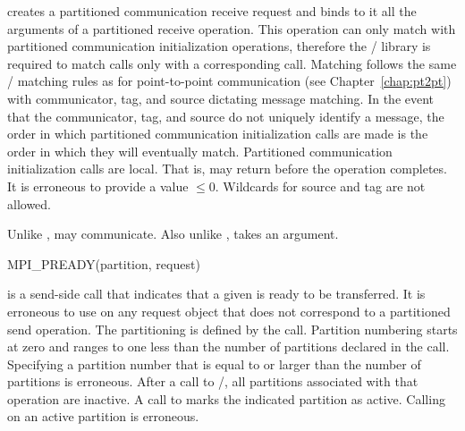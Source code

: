  creates a partitioned communication receive request
and binds to it all the
arguments of a partitioned receive operation.
This operation can only match with partitioned communication initialization operations,
therefore the \MPI/ library is required to match  calls only with a corresponding
 call. 
Matching follows the same \MPI/ matching rules as for point-to-point communication (see Chapter~\ref{chap:pt2pt}) with communicator, tag, and source dictating
message matching. In the event that the communicator, tag, and source do not
uniquely identify a message, the order in which partitioned 
communication initialization calls are made
is the order in which they will eventually match.
Partitioned communication initialization calls are
local. That is,  may return before the operation
completes. It is erroneous to provide a  value $\le 0$. Wildcards for source and tag are not allowed.

\begin{implementors}
Unlike ,  may communicate.
Also unlike ,  takes an  argument.
\end{implementors}

\begin{funcdef}{MPI\_PREADY}{(\mbox{partition}, \mbox{request})}
\end{funcdef}

 is a send-side call that indicates that a given  is ready to be
transferred.  It is erroneous to use  on any request object that does not correspond to a partitioned send operation.
The partitioning is defined by the  call.
Partition numbering starts at zero and ranges to one less than the number of partitions declared in
the  call.  
Specifying a partition number that is equal to or larger than the number of partitions is erroneous.
After a call to /, all partitions associated with that operation are inactive. A call to
 marks the indicated partition as active. 
Calling  on an active partition is erroneous.

